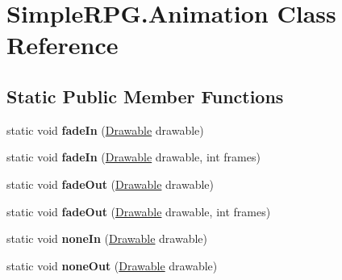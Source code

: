 \hypertarget{class_simple_r_p_g_1_1_animation}{\section{Simple\-R\-P\-G.\-Animation Class Reference}
\label{class_simple_r_p_g_1_1_animation}
}
\subsection*{Static Public Member Functions}
\begin{DoxyCompactItemize}
\item 
\hypertarget{class_simple_r_p_g_1_1_animation_a6c30d271e7914db827c587792d36c1ce}{static void {\bfseries fade\-In} (\hyperlink{class_simple_r_p_g_1_1_drawable}{Drawable} drawable)}\label{class_simple_r_p_g_1_1_animation_a6c30d271e7914db827c587792d36c1ce}

\item 
\hypertarget{class_simple_r_p_g_1_1_animation_a8a5a03c9d244c3248c828f5c8c961f9f}{static void {\bfseries fade\-In} (\hyperlink{class_simple_r_p_g_1_1_drawable}{Drawable} drawable, int frames)}\label{class_simple_r_p_g_1_1_animation_a8a5a03c9d244c3248c828f5c8c961f9f}

\item 
\hypertarget{class_simple_r_p_g_1_1_animation_a289c9da41575652f1b2573722af62527}{static void {\bfseries fade\-Out} (\hyperlink{class_simple_r_p_g_1_1_drawable}{Drawable} drawable)}\label{class_simple_r_p_g_1_1_animation_a289c9da41575652f1b2573722af62527}

\item 
\hypertarget{class_simple_r_p_g_1_1_animation_a464fa54ff15747341f46bffa81e5a977}{static void {\bfseries fade\-Out} (\hyperlink{class_simple_r_p_g_1_1_drawable}{Drawable} drawable, int frames)}\label{class_simple_r_p_g_1_1_animation_a464fa54ff15747341f46bffa81e5a977}

\item 
\hypertarget{class_simple_r_p_g_1_1_animation_a70728603a4b9154a487cbb8eb8bbef04}{static void {\bfseries none\-In} (\hyperlink{class_simple_r_p_g_1_1_drawable}{Drawable} drawable)}\label{class_simple_r_p_g_1_1_animation_a70728603a4b9154a487cbb8eb8bbef04}

\item 
\hypertarget{class_simple_r_p_g_1_1_animation_aece2c00c52312d164c9ecf73f6f342d7}{static void {\bfseries none\-Out} (\hyperlink{class_simple_r_p_g_1_1_drawable}{Drawable} drawable)}\label{class_simple_r_p_g_1_1_animation_aece2c00c52312d164c9ecf73f6f342d7}


\end{DoxyCompactItemize}
